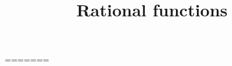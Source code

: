 %
%
%
%
%
%
%
%
%
%
%
%
=======
\documentclass{ximera}



\title[Refresh:]{Rational functions}


\begin{abstract}
  We review basic material for rational functions.
\end{abstract}
\maketitle


